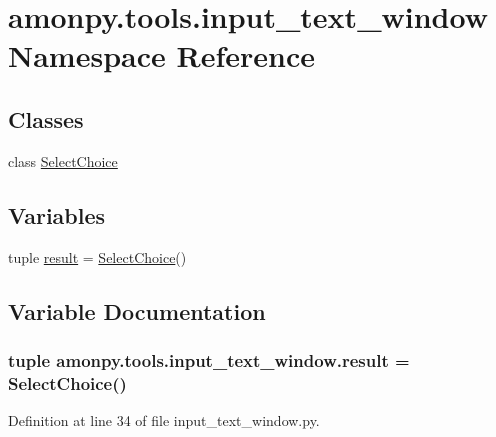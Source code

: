 \hypertarget{namespaceamonpy_1_1tools_1_1input__text__window}{\section{amonpy.\-tools.\-input\-\_\-text\-\_\-window Namespace Reference}
\label{namespaceamonpy_1_1tools_1_1input__text__window}
}
\subsection*{Classes}
\begin{DoxyCompactItemize}
\item 
class \hyperlink{classamonpy_1_1tools_1_1input__text__window_1_1_select_choice}{Select\-Choice}
\end{DoxyCompactItemize}
\subsection*{Variables}
\begin{DoxyCompactItemize}
\item 
tuple \hyperlink{namespaceamonpy_1_1tools_1_1input__text__window_adfea06d10c8dad207b8e9073fd936d79}{result} = \hyperlink{classamonpy_1_1tools_1_1input__text__window_1_1_select_choice}{Select\-Choice}()
\end{DoxyCompactItemize}


\subsection{Variable Documentation}
\hypertarget{namespaceamonpy_1_1tools_1_1input__text__window_adfea06d10c8dad207b8e9073fd936d79}{
\subsubsection[{result}]{\setlength{\rightskip}{0pt plus 5cm}tuple amonpy.\-tools.\-input\-\_\-text\-\_\-window.\-result = {\bf Select\-Choice}()}}\label{namespaceamonpy_1_1tools_1_1input__text__window_adfea06d10c8dad207b8e9073fd936d79}


Definition at line 34 of file input\-\_\-text\-\_\-window.\-py.

